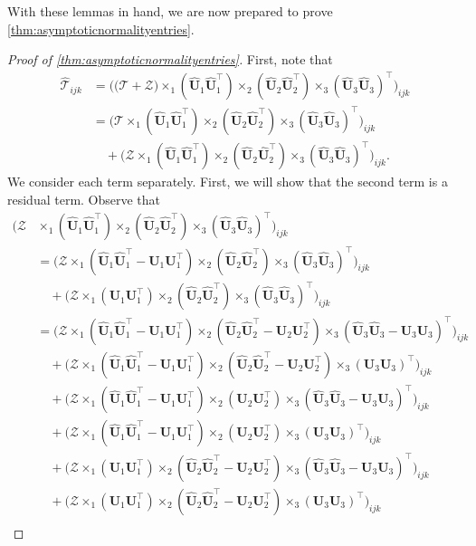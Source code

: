 \documentclass[10pt]{article}
\newcommand{\0}{{\mathbf{0}}}
\newcommand{\1}{{\mathbf{1}}}
\newcommand{\U}{{\mathbf{U}}}
\renewcommand{\t}{^{\top}}
\newcommand{\uhat}{\mathbf{\hat{U}}}
\renewcommand{\hat}{\widehat}
\renewcommand{\hat}{\widehat}
\begin{document}
With these lemmas in hand, we are now prepared to prove \cref{thm:asymptoticnormalityentries}.
\begin{proof}[Proof of \cref{thm:asymptoticnormalityentries}]
First, note that
\begin{align*}
    \mathcal{\hat T}_{ijk} &= \bigg( \big( \mathcal{T + Z} \big) \times_1 (\uhat_1 \uhat_1\t) \times_2 (\uhat_2 \uhat_2\t) \times_3 (\uhat_3 \uhat_3)\t \bigg)_{ijk} \\
    &= \bigg( \mathcal{T} \times_1 (\uhat_1 \uhat_1\t) \times_2 (\uhat_2 \uhat_2\t) \times_3 (\uhat_3 \uhat_3)\t \bigg)_{ijk} \\
    &\quad + \bigg(\mathcal{Z} \times_1 (\uhat_1 \uhat_1\t) \times_2 (\uhat_2 \uhat_2\t) \times_3 (\uhat_3 \uhat_3)\t \bigg)_{ijk}.
\end{align*}
We consider each term separately. First, we will show that the second term is a residual term.  Observe that %
\begin{align*}
    \bigg(\mathcal{Z} &\times_1 (\uhat_1 \uhat_1\t) \times_2 (\uhat_2 \uhat_2\t) \times_3 (\uhat_3 \uhat_3)\t \bigg)_{ijk} \\
    &=  \bigg(\mathcal{Z} \times_1 (\uhat_1 \uhat_1\t - \U_1 \U_1\t ) \times_2 (\uhat_2 \uhat_2\t) \times_3 (\uhat_3 \uhat_3)\t \bigg)_{ijk} \\
    &\quad + \bigg(\mathcal{Z} \times_1 ( \U_1 \U_1\t ) \times_2 (\uhat_2 \uhat_2\t) \times_3 (\uhat_3 \uhat_3)\t \bigg)_{ijk} \\
    &= \bigg(\mathcal{Z} \times_1 (\uhat_1 \uhat_1\t - \U_1 \U_1\t ) \times_2 (\uhat_2 \uhat_2\t - \U_2 \U_2\t) \times_3 (\uhat_3 \uhat_3 - \U_3 \U_3)\t \bigg)_{ijk} \\
    &\quad + \bigg(\mathcal{Z} \times_1 (\uhat_1 \uhat_1\t - \U_1 \U_1\t ) \times_2 (\uhat_2 \uhat_2\t - \U_2 \U_2\t) \times_3 ( \U_3 \U_3)\t \bigg)_{ijk} \\
    &\quad + \bigg(\mathcal{Z} \times_1 (\uhat_1 \uhat_1\t - \U_1 \U_1\t ) \times_2 ( \U_2 \U_2\t) \times_3 (\uhat_3 \uhat_3 - \U_3 \U_3)\t \bigg)_{ijk} \\
        &\quad + \bigg(\mathcal{Z} \times_1 (\uhat_1 \uhat_1\t - \U_1 \U_1\t ) \times_2 ( \U_2 \U_2\t) \times_3 (\U_3 \U_3)\t \bigg)_{ijk} \\
    &\quad + \bigg(\mathcal{Z} \times_1 ( \U_1 \U_1\t ) \times_2 (\uhat_2 \uhat_2\t - \U_2 \U_2\t ) \times_3 (\uhat_3 \uhat_3 - \U_3 \U_3)\t \bigg)_{ijk} \\
     &\quad + \bigg(\mathcal{Z} \times_1 ( \U_1 \U_1\t ) \times_2 (\uhat_2 \uhat_2\t - \U_2 \U_2\t ) \times_3 (\U_3 \U_3)\t \bigg)_{ijk} \\

\end{align*}
\end{proof}
\end{document}
